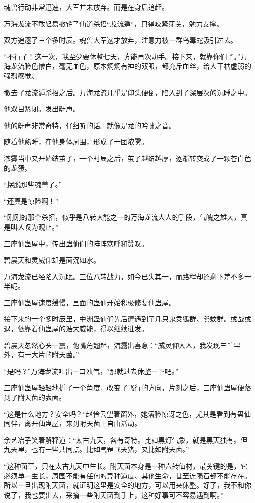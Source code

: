 \begin{this_body}
魂兽行动非常迅速，大军并未放弃。而是在身后追赶。

万海龙流不敢轻易撤销了仙道杀招“龙流遁”，只得咬紧牙关，勉力支撑。

双方追逐了三个多时辰。魂兽大军这才放弃，注意力被一群乌毒蛇吸引过去。

“不行了！这一次，我至少要休整七天，方能再次动手。接下来，就靠你们了。”万海龙流脸色惨白，毫无血色，原本炯炯有神的双眼，都充斥血丝，给人干枯虚弱的强烈感觉。

撤去了龙流遁杀招之后。万海龙流几乎是仰头便倒，陷入到了深层次的沉睡之中。

他双目紧闭。发出鼾声。

他的鼾声非常奇特，仔细听的话。就像是龙的吟啸之音。

随着他熟睡，在他身体周围，形成了一团浓雾。

浓雾当中又开始结茧子，一个时辰之后，茧子越结越厚，逐渐转变成了一颗苍白色的龙蛋。

“摆脱那些魂兽了。”

“还真是惊险啊！”

“刚刚的那个杀招，似乎是八转大能之一的万海龙流大人的手段，气魄之雄大，真是叫人叹为观止。”

三座仙蛊屋中，传出蛊仙们的阵阵欢呼和赞叹。

碧晨天和灵威仰却是面沉如水。

万海龙流已经陷入沉眠。三位八转战力，如今已失其一，而路程却还剩下差不多一半呢。

三座仙蛊屋速度缓慢，里面的蛊仙开始积极修复仙蛊屋。

接下来的一个多时辰里，中洲蛊仙们先后遭遇到了几只鬼灵狐群、熊蚊群。或战或退，依靠着仙蛊屋的浩大威能，得以继续进发。

碧晨天忽然心头一震，他嘴角翘起，流露出喜意：“威灵仰大人，我发现三千里外，有一大片的附天菌。”

“是吗？”万海龙流吐出一口浊气，“那就过去休整一下吧。”

三座仙蛊屋轻轻地折了一个角度，改变了飞行的方向，片刻之后，三座仙蛊屋便落到了附天菌的表面。

“这是什么地方？安全吗？”赵怜云望着窗外，她满脸惊讶之色，尤其是看到有蛊仙同伴，离开仙蛊屋，来到附天菌上自由活动。

余艺冶子笑着解释道：“太古九天，各有奇特。比如黑灯气象，就是黑天独有。但九天里，也有一些共同点。比如气罡飞天猪，又比如附天菌。”

“这种菌草，只在太古九天中生长。附天菌本身是一种六转仙材，最关键的是，它必须单一生长，周围不能有任何的异种道痕、其他生命，甚至连陨石都不能存在。所以一旦出现附天菌，就证明这里是安全的地方，可以用来休整。好了，我不和你说了，我也要出去，采摘一些附天菌到手上，这种好事可不容易遇到啊。”


\end{this_body}
